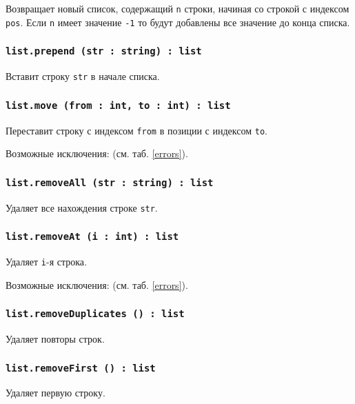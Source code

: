 Возвращает новый список, содержащий \texttt{n} строки, начиная со строкой с индексом \texttt{pos}. Если \texttt{n} имеет значение \texttt{-1} то будут добавлены все значение до конца списка.

\subsubsection{\texttt{list.prepend (str : string) : list}}

Вставит строку \texttt{str} в начале списка.

\subsubsection{\texttt{list.move (from : int, to : int) : list}}

Переставит строку с индексом \texttt{from} в позиции с индексом \texttt{to}.

Возможные исключения:  (см. таб. \ref{errors}).

\subsubsection{\texttt{list.removeAll (str : string) : list}}

Удаляет все нахождения строке \texttt{str}.

\subsubsection{\texttt{list.removeAt (i : int) : list}}

Удаляет \texttt{i}-я строка.

Возможные исключения:  (см. таб. \ref{errors}).

\subsubsection{\texttt{list.removeDuplicates () : list}}

Удаляет повторы строк.

\subsubsection{\texttt{list.removeFirst () : list}}

Удаляет первую строку.

